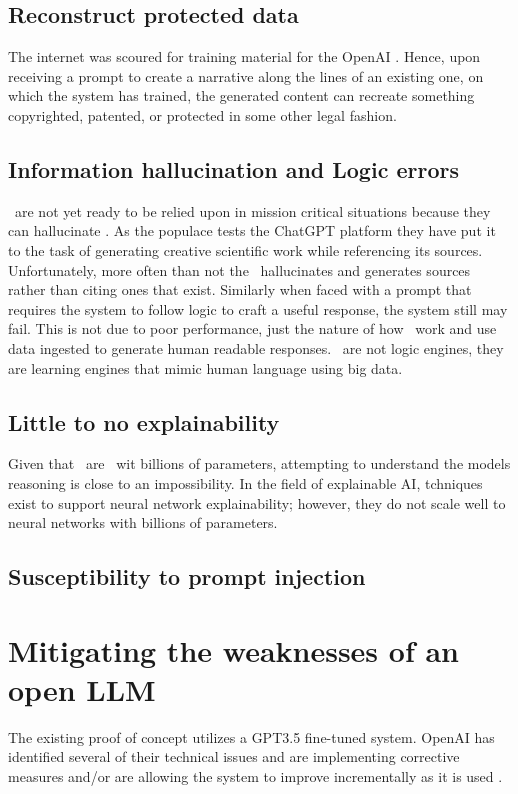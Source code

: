 \subsection{Reconstruct protected data}
The internet was scoured for training material for the OpenAI \gpts. 
Hence, upon receiving a prompt to create a narrative along the lines of an existing one, on which the system has trained, the generated content can recreate something copyrighted, patented, or protected in some other legal fashion.


\subsection{Information hallucination and Logic errors}
\llms\ are not yet ready to be relied upon in mission critical situations because they can hallucinate \cite{OpenAI:2023:gpt4}.
As the populace tests the ChatGPT platform they have put it to the task of generating creative scientific work while referencing its sources.
Unfortunately, more often than not the \gai\ hallucinates and generates sources rather than citing ones that exist.
Similarly when faced with a prompt that requires the system to follow logic to craft a useful response, the system still may fail.
This is not due to poor performance, just the nature of how \llms\ work and use data ingested to generate human readable responses.
\llms\ are not logic engines, they are learning engines that mimic human language using big data.

 
\subsection{Little to no explainability}
Given that \gpts\ are \llms\ wit billions of parameters, attempting to understand the models reasoning is close to an impossibility.
In the field of explainable AI, tchniques exist to support neural network explainability; however, they do not scale well to neural networks with billions of parameters.

\subsection{Susceptibility to prompt injection}

\section{Mitigating the weaknesses of an open LLM}
The existing proof of concept utilizes a GPT3.5 fine-tuned system.
OpenAI has identified several of their technical issues and are implementing corrective measures and/or are allowing the system to improve incrementally as it is used \cite{OpenAI:2023:gpt4}.

